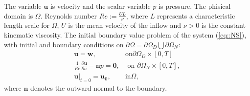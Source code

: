 \documentclass[mathpazo]{aamm}
\begin{document}
    The variable $\mathbf{u}$ is velocity and the scalar
    variable $p$ is pressure. The phisical domain is
    $\Omega$. Reynolds number $Re :=
    \frac{UL}{\nu}$, where $L$ represents a characteristic length scale
    for $\Omega$, $U$ is the mean velocity
    of the inflow and $\nu > 0$ is the constant kinematic
    viscosity. The initial boundary value problem of the system
    (\ref{eq::NS}), with initial and boundary conditions on $\partial
    \Omega = \partial \Omega_D \bigcup \partial \Omega_N$:
    \begin{equation}
      \begin{array}{ll}
        \mathbf{u} = \mathbf{w},& \mbox{on} \partial \Omega_D \times [0,
        T]\\
        \frac{1}{Re} \displaystyle \frac{\partial \mathbf{u}}{\partial n} - \mathbf{n}p =
        \mathbf{0}, & \mbox{ on } \partial \Omega_N \times [0, T],  \\
        \mathbf{u}|_{t = 0} = \mathbf{u_0}, & \mbox{in} \Omega, 
      \end{array}
      \label{eq::bc}
    \end{equation} 
    where $\mathbf{n}$ denotes the outward normal to the boundary. 

    
\end{document}
